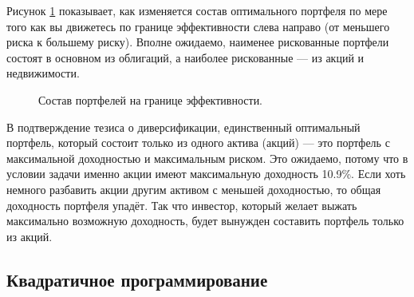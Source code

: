 Рисунок \ref{efficient_frontier_allocation} показывает, как изменяется состав оптимального портфеля по мере того как вы движетесь по границе эффективности слева направо (от меньшего риска к большему риску). Вполне ожидаемо, наименее рискованные портфели состоят в основном из облигаций, а наиболее рискованные --- из акций и недвижимости.

\begin{figure}[h]
\centering
{}

\caption{Состав портфелей на границе эффективности.}
\label{efficient_frontier_allocation}
\end{figure}

В подтверждение тезиса о диверсификации, единственный оптимальный портфель, который состоит только из одного актива (акций) --- это портфель с максимальной доходностью и максимальным риском. Это ожидаемо, потому что в условии задачи именно акции имеют максимальную доходность 10.9\%. Если хоть немного разбавить акции другим активом с меньшей доходностью, то общая доходность портфеля упадёт. Так что инвестор, который желает выжать максимально возможную доходность, будет вынужден составить портфель только из акций.

\subsection{Квадратичное программирование}

